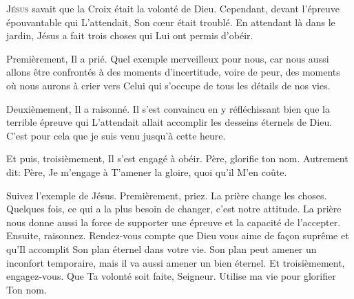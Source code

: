 \dvrule







\lettrine{J}{ésus} savait que la Croix était la volonté de Dieu.
 Cependant, devant l'épreuve épouvantable qui L'attendait,
 Son c\oe{}ur était troublé. En attendant là dans le jardin,
 Jésus a fait trois choses qui Lui ont permis d'obéir.

Premièrement, Il a prié. Quel exemple merveilleux pour nous,
 car nous aussi allons être confrontés à des moments d'incertitude,
 voire de peur, des moments où nous aurons à crier vers Celui
 qui s'occupe de tous les détails de nos vies.


Deuxièmement, Il a raisonné. Il s'est convaincu en y réfléchissant
 bien que la terrible épreuve qui L'attendait allait accomplir
 les desseins éternels de Dieu.
 \Og C'est pour cela que je suis venu jusqu'à cette heure. \Fg{}

Et puis, troisièmement, Il s'est engagé à obéir.
 \Og Père, glorifie ton nom. \Fg{}
 Autrement dit: 
 \Og Père, Je m'engage à T'amener la gloire, quoi qu'il M'en coûte. \Fg{}

Suivez l'exemple de Jésus. Premièrement, priez.
 La prière change les choses. Quelques fois, 
 ce qui a la plus besoin de changer, c'est notre attitude.
 La prière nous donne aussi la force de supporter une épreuve
 et la capacité de l'accepter. Ensuite, raisonnez. 
 Rendez-vous compte que Dieu vous aime de fa\c{c}on suprême et qu'Il accomplit
 Son plan éternel dans votre vie.
 Son plan peut amener un inconfort temporaire, mais il va aussi amener
 un bien éternel. Et troisièmement, engagez-vous.
 \Og Que Ta volonté soit faite, Seigneur.
 Utilise ma vie pour glorifier Ton nom. \Fg{}

